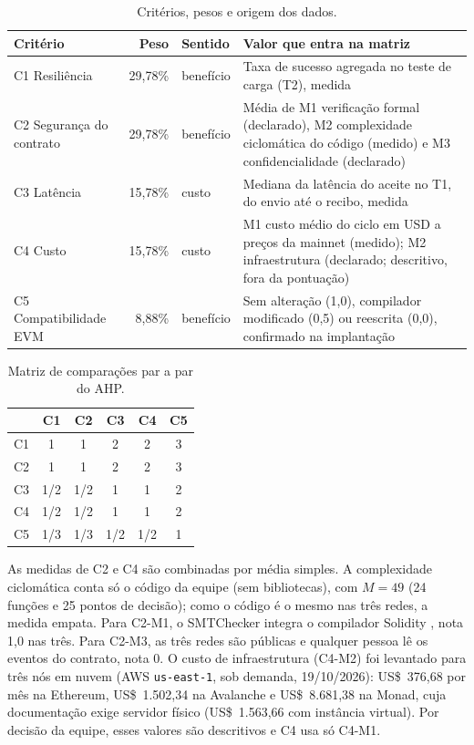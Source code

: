 \documentclass[10pt,a4paper]{article}
\newcommand{\fn}[1]{\texttt{#1}}
\begin{document}
\begin{table}[ht]
\centering
\caption{Critérios, pesos e origem dos dados.}\label{tab:criterios}
\small
\begin{tabularx}{\linewidth}{@{}lrlX@{}}
\toprule
Critério & Peso & Sentido & Valor que entra na matriz \\
\midrule
C1 Resiliência & 29,78\% & benefício & Taxa de sucesso agregada no teste de carga (T2), medida \\
C2 Segurança do contrato & 29,78\% & benefício & Média de M1 verificação formal (declarado), M2 complexidade ciclomática do código (medido) e M3 confidencialidade (declarado) \\
C3 Latência & 15,78\% & custo & Mediana da latência do aceite no T1, do envio até o recibo, medida \\
C4 Custo & 15,78\% & custo & M1 custo médio do ciclo em USD a preços da mainnet (medido); M2 infraestrutura (declarado; descritivo, fora da pontuação) \\
C5 Compatibilidade EVM & 8,88\% & benefício & Sem alteração (1,0), compilador modificado (0,5) ou reescrita (0,0), confirmado na implantação \\
\bottomrule
\end{tabularx}
\end{table}

\begin{table}[ht]
\centering
\caption{Matriz de comparações par a par do AHP.}\label{tab:ahp}
\small
\begin{tabular}{@{}lccccc@{}}
\toprule
 & C1 & C2 & C3 & C4 & C5 \\
\midrule
C1 & 1 & 1 & 2 & 2 & 3 \\
C2 & 1 & 1 & 2 & 2 & 3 \\
C3 & 1/2 & 1/2 & 1 & 1 & 2 \\
C4 & 1/2 & 1/2 & 1 & 1 & 2 \\
C5 & 1/3 & 1/3 & 1/2 & 1/2 & 1 \\
\bottomrule
\end{tabular}
\end{table}

As medidas de C2 e C4 são combinadas por média simples. A complexidade ciclomática \cite{mccabe1976} conta só o código da equipe (sem bibliotecas), com $M = 49$ (24 funções e 25 pontos de decisão); como o código é o mesmo nas três redes, a medida empata. Para C2-M1, o SMTChecker integra o compilador Solidity \cite{solidity2024smt}, nota 1,0 nas três. Para C2-M3, as três redes são públicas e qualquer pessoa lê os eventos do contrato, nota 0. O custo de infraestrutura (C4-M2) foi levantado para três nós em nuvem (AWS \fn{us-east-1}, sob demanda, 19/10/2026): US\$~376,68 por mês na Ethereum, US\$~1.502,34 na Avalanche e US\$~8.681,38 na Monad, cuja documentação exige servidor físico (US\$~1.563,66 com instância virtual). Por decisão da equipe, esses valores são descritivos e C4 usa só C4-M1.
\end{document}
